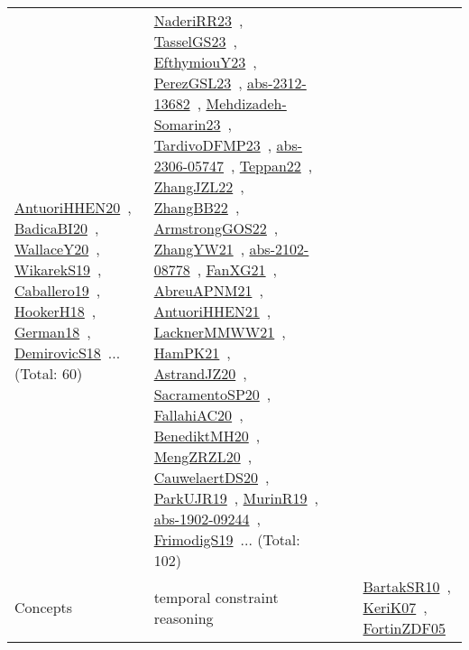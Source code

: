 {\begin{longtable}{lp{3cm}>{\raggedright\arraybackslash}p{6cm}>{\raggedright\arraybackslash}p{6cm}>{\raggedright\arraybackslash}p{8cm}}
\href{works/AntuoriHHEN20.pdf}{AntuoriHHEN20}~\cite{AntuoriHHEN20}, \href{works/BadicaBI20.pdf}{BadicaBI20}~\cite{BadicaBI20}, \href{works/WallaceY20.pdf}{WallaceY20}~\cite{WallaceY20}, \href{works/WikarekS19.pdf}{WikarekS19}~\cite{WikarekS19}, \href{works/Caballero19.pdf}{Caballero19}~\cite{Caballero19}, \href{works/HookerH18.pdf}{HookerH18}~\cite{HookerH18}, \href{works/German18.pdf}{German18}~\cite{German18}, \href{works/DemirovicS18.pdf}{DemirovicS18}~\cite{DemirovicS18}... (Total: 60) & \href{works/NaderiRR23.pdf}{NaderiRR23}~\cite{NaderiRR23}, \href{works/TasselGS23.pdf}{TasselGS23}~\cite{TasselGS23}, \href{works/EfthymiouY23.pdf}{EfthymiouY23}~\cite{EfthymiouY23}, \href{works/PerezGSL23.pdf}{PerezGSL23}~\cite{PerezGSL23}, \href{works/abs-2312-13682.pdf}{abs-2312-13682}~\cite{abs-2312-13682}, \href{works/Mehdizadeh-Somarin23.pdf}{Mehdizadeh-Somarin23}~\cite{Mehdizadeh-Somarin23}, \href{works/TardivoDFMP23.pdf}{TardivoDFMP23}~\cite{TardivoDFMP23}, \href{works/abs-2306-05747.pdf}{abs-2306-05747}~\cite{abs-2306-05747}, \href{works/Teppan22.pdf}{Teppan22}~\cite{Teppan22}, \href{works/ZhangJZL22.pdf}{ZhangJZL22}~\cite{ZhangJZL22}, \href{works/ZhangBB22.pdf}{ZhangBB22}~\cite{ZhangBB22}, \href{works/ArmstrongGOS22.pdf}{ArmstrongGOS22}~\cite{ArmstrongGOS22}, \href{works/ZhangYW21.pdf}{ZhangYW21}~\cite{ZhangYW21}, \href{works/abs-2102-08778.pdf}{abs-2102-08778}~\cite{abs-2102-08778}, \href{works/FanXG21.pdf}{FanXG21}~\cite{FanXG21}, \href{works/AbreuAPNM21.pdf}{AbreuAPNM21}~\cite{AbreuAPNM21}, \href{works/AntuoriHHEN21.pdf}{AntuoriHHEN21}~\cite{AntuoriHHEN21}, \href{works/LacknerMMWW21.pdf}{LacknerMMWW21}~\cite{LacknerMMWW21}, \href{works/HamPK21.pdf}{HamPK21}~\cite{HamPK21}, \href{works/AstrandJZ20.pdf}{AstrandJZ20}~\cite{AstrandJZ20}, \href{works/SacramentoSP20.pdf}{SacramentoSP20}~\cite{SacramentoSP20}, \href{works/FallahiAC20.pdf}{FallahiAC20}~\cite{FallahiAC20}, \href{works/BenediktMH20.pdf}{BenediktMH20}~\cite{BenediktMH20}, \href{works/MengZRZL20.pdf}{MengZRZL20}~\cite{MengZRZL20}, \href{works/CauwelaertDS20.pdf}{CauwelaertDS20}~\cite{CauwelaertDS20}, \href{works/ParkUJR19.pdf}{ParkUJR19}~\cite{ParkUJR19}, \href{works/MurinR19.pdf}{MurinR19}~\cite{MurinR19}, \href{works/abs-1902-09244.pdf}{abs-1902-09244}~\cite{abs-1902-09244}, \href{works/FrimodigS19.pdf}{FrimodigS19}~\cite{FrimodigS19}... (Total: 102)\\
Concepts & temporal constraint reasoning &  &  & \href{works/BartakSR10.pdf}{BartakSR10}~\cite{BartakSR10}, \href{works/KeriK07.pdf}{KeriK07}~\cite{KeriK07}, \href{works/FortinZDF05.pdf}{FortinZDF05}~\cite{FortinZDF05}\\

\end{longtable}}
